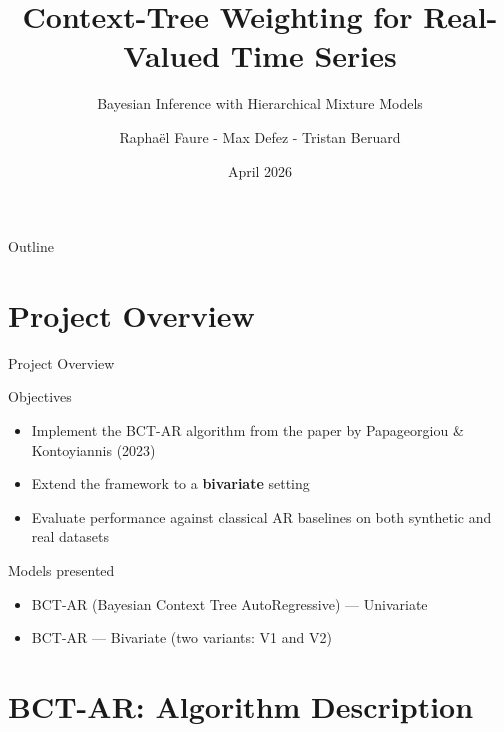 \documentclass[10pt]{beamer}
\title[CTW for Real-Valued Time Series]{Context-Tree Weighting for Real-Valued Time Series}
\subtitle{Bayesian Inference with Hierarchical Mixture Models}
\author{Raphaël Faure - Max Defez - Tristan Beruard}
\date{April 2026}
\begin{document}
\begin{frame}
\titlepage
\end{frame}

\begin{frame}{Outline}
\tableofcontents
\end{frame}

\section{Project Overview}

\begin{frame}{Project Overview}
\begin{block}{Objectives}
\begin{itemize}
    \item Implement the BCT-AR algorithm from the paper by Papageorgiou \& Kontoyiannis (2023)
    \item Extend the framework to a \textbf{bivariate} setting
    \item Evaluate performance against classical AR baselines on both synthetic and real datasets
\end{itemize}
\end{block}
\begin{block}{Models presented}
\begin{itemize}
    \item BCT-AR (Bayesian Context Tree AutoRegressive) --- Univariate
    \item BCT-AR --- Bivariate (two variants: V1 and V2)
\end{itemize}
\end{block}
\end{frame}

\section{BCT-AR: Algorithm Description}
\end{document}
